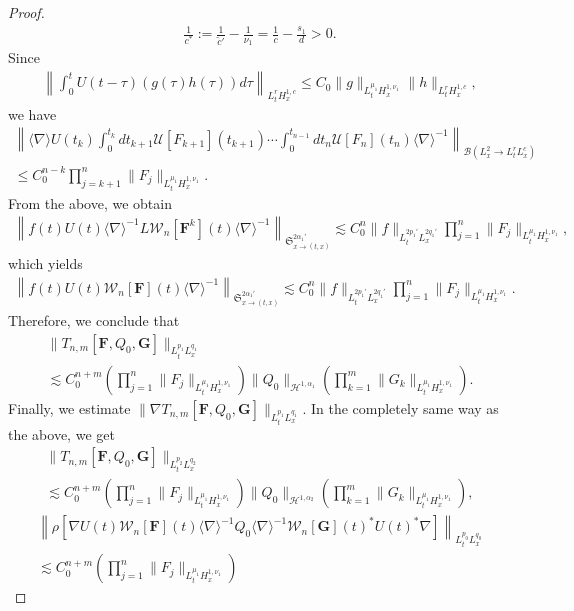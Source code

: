 \documentclass[AHL,Unicode,longabstracts,MathTools,published]{cedram}
\newcommand{\vF}{{\mathbf{F}}}
\newcommand{\vG}{{\mathbf{G}}}
\newcommand{\CB}{\mathcal{B}}
\newcommand{\CH}{\mathcal{H}}
\newcommand{\CU}{\mathcal{U}}
\newcommand{\CW}{\mathcal{W}}
\newcommand{\FS}{\mathfrak{S}}
\newcommand{\al}{\alpha}
\newcommand{\ta}{\tau}
\newcommand{\rh}{\rho}
\newcommand{\wt}{\widetilde}
\newcommand{\Dk}[1]{\left[#1\right]}
\newcommand{\K}[1]{\left(#1\right)}
\renewcommand{\No}[1]{\left\| #1 \right\|}
\newcommand{\sd}{\langle \nabla \rangle}
\newcommand{\sdi}{\sd^{-1}}
\newcommand{\tx}{{t,x}}
\newcommand{\na}{\nabla}
\newcommand{\ls}{\lesssim}
\begin{document}
\begin{proof}
\begin{align}
\frac{1}{c^*}:=\frac{1}{\wt{c}'}-\frac{1}{\nu_1} = \frac{1}{c}-\frac{s_1}{d} > 0.
\end{align}
Since
\begin{align}
\No{
\int_0^t U(t-\ta)(g(\ta)h(\ta)) d\ta }_{L^r_t H^{1,c}_x}
\le C_0 \|g\|_{L^{\mu_1}_t H^{1,\nu_1}_x} \|h\|_{L^r_t H^{1,c}_x},
\end{align}
we have
\begin{multline}
\No{
\sd U(t_k)
\int_0^{t_k}dt_{k+1} \CU[F_{k+1}](t_{k+1})
\cdots
\int_0^{t_{n-1}} dt_n \CU[F_n](t_n) \sdi }_{\CB\left(L^2_x \to L^r_t L^c_x\right)} \\
\le C_0^{n-k}
\prod_{j=k+1}^n \|F_j\|_{L^{\mu_1}_t H^{1,\nu_1}_x}.
\end{multline}
From the above, we obtain
\begin{align}
\left\|f(t) U(t) \sdi L \CW_n[\vF^k](t) \sd^{-1}\right\|_{\FS^{2\al_1'}_{x \to (\tx)}}
\ls C_0^n \|f\|_{L^{2p_1'}_t L^{2q_1'}_x}\prod_{j=1}^n \|F_j\|_{L^{\mu_1}_t H^{1,\nu_1}_x},
\end{align}
which yields
\begin{align}\label{half}
\left\|f(t)U(t)\CW_n[\vF](t) \sd^{-1} \right\|_{\FS^{2\al_1'}_{x \to (\tx)}}
\ls C_0^n \|f\|_{L^{2p_1'}_t L^{2q_1'}_x}\prod_{j=1}^n \|F_j\|_{L^{\mu_1}_t H^{1,\nu_1}_x}.
\end{align}
Therefore, we conclude that
\begin{multline}
\|T_{n,m}[\vF,Q_0,\vG]\|_{L^{p_1}_t L^{q_1}_x}
\\
\ls C_0^{n+m} \K{\prod_{j=1}^n
\|F_j\|_{L^{\mu_1}_t H^{1,\nu_1}_x}}
\|Q_0\|_{\CH^{1,\al_1}}
\K{\prod_{k=1}^m \|G_k\|_{L^{\mu_1}_t H^{1,\nu_1}_x}}.
\end{multline}
Finally, we estimate $\|\na T_{n,m}[\vF,Q_0,\vG]\|_{L^{p_1}_t L^{q_1}_x}$. In the completely same way as the above, we get
\begin{multline}\label{End H1}
\|T_{n,m} [\vF,Q_0,\vG]\|_{L^{p_2}_t L^{q_2}_x}\\
\ls C_0^{n+m}
\K{\prod_{j=1}^n \|F_j\|_{L^{\mu_1}_t H^{1,\nu_1}_x}}
\|Q_0\|_{\CH^{1,\al_2}}
\K{\prod_{k=1}^ m\|G_k\|_{L^{\mu_1}_t H^{1,\nu_1}_x}}, 
\end{multline}
\begin{multline}\label{deriv L2}
\left\|\rh\Dk{\na U(t)\CW_n[\vF](t) \sdi Q_0 \sdi \CW_n[\vG](t)^* U(t)^* \na} \right\|_{L^{p_0}_t L^{q_0}_x} \\
\ls C_0^{n+m} \K{\prod_{j=1}^n \|F_j\|_{L^{\mu_1}_t H^{1,\nu_1}_x}}

\end{multline}
\end{proof}
\end{document}
